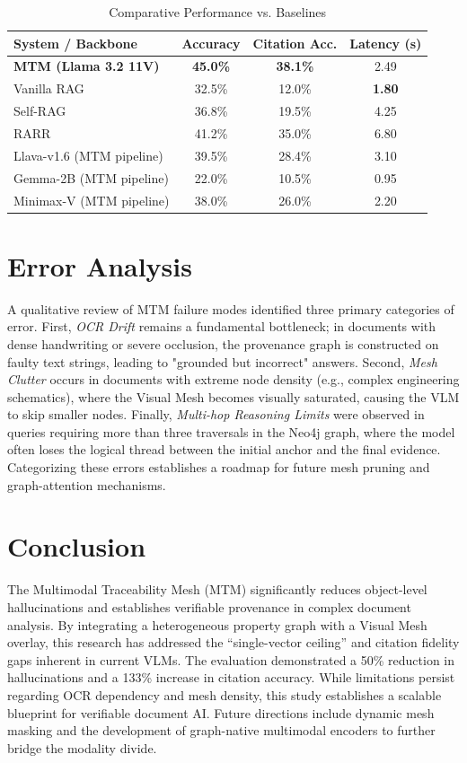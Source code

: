 \documentclass[11pt]{article}
\begin{document}
\begin{table}[h]
\centering
\caption{Comparative Performance vs. Baselines}
\label{tab:comparison}
\begin{tabular}{lccc}
\toprule
System / Backbone & Accuracy & Citation Acc. & Latency (s) \\
\midrule
\textbf{MTM (Llama 3.2 11V)} & \textbf{45.0\%} & \textbf{38.1\%} & 2.49 \\
Vanilla RAG & 32.5\% & 12.0\% & \textbf{1.80} \\
Self-RAG & 36.8\% & 19.5\% & 4.25 \\
RARR & 41.2\% & 35.0\% & 6.80 \\
Llava-v1.6 (MTM pipeline) & 39.5\% & 28.4\% & 3.10 \\
Gemma-2B (MTM pipeline) & 22.0\% & 10.5\% & 0.95 \\
Minimax-V (MTM pipeline) & 38.0\% & 26.0\% & 2.20 \\
\bottomrule
\end{tabular}
\end{table}

\section{Error Analysis}
A qualitative review of MTM failure modes identified three primary categories of error. First, \textit{OCR Drift} remains a fundamental bottleneck; in documents with dense handwriting or severe occlusion, the provenance graph is constructed on faulty text strings, leading to "grounded but incorrect" answers. Second, \textit{Mesh Clutter} occurs in documents with extreme node density (e.g., complex engineering schematics), where the Visual Mesh becomes visually saturated, causing the VLM to skip smaller nodes. Finally, \textit{Multi-hop Reasoning Limits} were observed in queries requiring more than three traversals in the Neo4j graph, where the model often loses the logical thread between the initial anchor and the final evidence. Categorizing these errors establishes a roadmap for future mesh pruning and graph-attention mechanisms.


\section{Conclusion}
The Multimodal Traceability Mesh (MTM) significantly reduces object-level hallucinations and establishes verifiable provenance in complex document analysis. By integrating a heterogeneous property graph with a Visual Mesh overlay, this research has addressed the ``single-vector ceiling'' and citation fidelity gaps inherent in current VLMs. The evaluation demonstrated a 50\% reduction in hallucinations and a 133\% increase in citation accuracy. While limitations persist regarding OCR dependency and mesh density, this study establishes a scalable blueprint for verifiable document AI. Future directions include dynamic mesh masking and the development of graph-native multimodal encoders to further bridge the modality divide.
\end{document}
